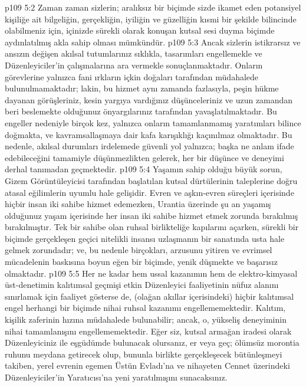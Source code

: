 \vs p109 5:2 Zaman zaman sizlerin; aralıksız bir biçimde sizde ikamet eden potansiyel kişiliğe ait bilgeliğin, gerçekliğin, iyiliğin ve güzelliğin kısmi bir şekilde bilincinde olabilmeniz için, içinizde sürekli olarak konuşan kutsal sesi duyma biçimde aydınlatılmış akla sahip olması mümkündür.
\vs p109 5:3 Ancak sizlerin istikrarsız ve ansızın değişen akılsal tutumlarınız sıklıkla, tasarımları engellemekle ve Düzenleyiciler’in çalışmalarına ara vermekle sonuçlanmaktadır. Onların görevlerine yalnızca fani ırkların içkin doğaları tarafından müdahalede bulunulmamaktadır; lakin, bu hizmet aynı zamanda fazlasıyla, peşin hükme dayanan görüşleriniz, kesin yargıya vardığınız düşünceleriniz ve uzun zamandan beri beslemekte olduğunuz önyargılarınız tarafından yavaşlatılmaktadır. Bu engeller nedeniyle birçok kez, yalnızca onların tamamlanmamış yaratımları bilince doğmakta, ve kavramsallaşmaya dair kafa karışıklığı kaçınılmaz olmaktadır. Bu nedenle, akılsal durumları irdelemede güvenli yol yalnızca; başka ne anlam ifade edebileceğini tamamiyle düşünmezlikten gelerek, her bir düşünce ve deneyimi derhal tanımadan geçmektedir.
\vs p109 5:4 Yaşamın sahip olduğu büyük sorun, Gizem Görüntüleyicisi tarafından başlatılan kutsal dürtülerinin taleplerine doğru atasal eğilimlerin uyumlu hale gelişidir. Evren ve aşkın\hyp{}evren süreçleri içerisinde hiçbir insan iki sahibe hizmet edemezken, Urantia üzerinde şu an yaşamış olduğunuz yaşam içerisinde her insan iki sahibe hizmet etmek zorunda bırakılmış bırakılmıştır. Tek bir sahibe olan ruhsal birlikteliğe kapılarını açarken, sürekli bir biçimde gerçekleşen geçici nitelikli insansı uzlaşmanın bir sanatında usta hale gelmek zorundadır; ve, bu nedenle birçokları, arzusunu yitiren ve evrimsel mücadelenin baskısına boyun eğen bir biçimde, yenik düşmekte ve başarısız olmaktadır.
\vs p109 5:5 Her ne kadar hem ussal kazanımın hem de elektro\hyp{}kimyasal üst\hyp{}denetimin kalıtımsal geçmişi etkin Düzenleyici faaliyetinin nüfuz alanını sınırlamak için faaliyet gösterse de, (olağan akıllar içerisindeki) hiçbir kalıtımsal engel herhangi bir biçimde nihai ruhsal kazanımı engellememektedir. Kalıtım, kişilik zaferinin hızına müdahalede bulunabilir; ancak, o, yükseliş deneyiminin nihai tamamlanışını engellememektedir. Eğer siz, kutsal armağan iradesi olarak Düzenleyiciniz ile eşgüdümde bulunacak olursanız, er veya geç; ölümsüz morontia ruhunu meydana getirecek olup, bununla birlikte gerçekleşecek bütünleşmeyi takiben, yerel evrenin egemen Üstün Evladı’na ve nihayeten Cennet üzerindeki Düzenleyiciler’in Yaratıcısı’na yeni yaratılmışını sunacaksınız.
